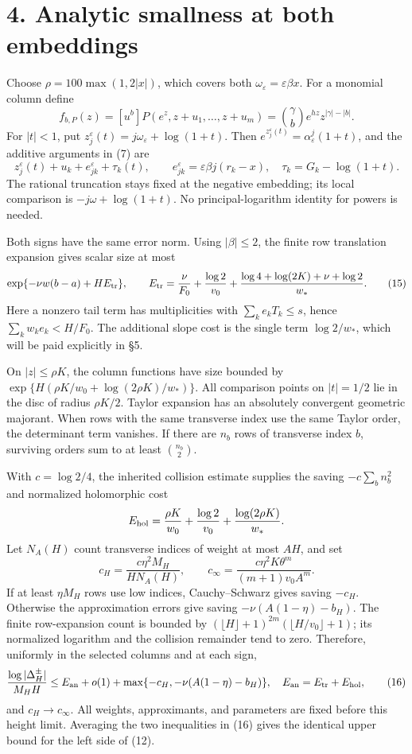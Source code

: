 \documentclass[11pt]{article}
\begin{document}
\section{4. Analytic smallness at both
embeddings}\label{analytic-smallness-at-both-embeddings}

Choose \(\rho=100\max(1,2|x|)\), which covers both
\(\omega_\varepsilon=\varepsilon\beta x\). For a monomial column define
\[
f_{b,P}(z)=[u^b]P(e^z,z+u_1,\ldots,z+u_m)
=\binom\gamma b e^{hz}z^{|\gamma|-|b|}.
\] For \(|t|<1\), put
\(z_j^\varepsilon(t)=j\omega_\varepsilon+\log(1+t)\). Then
\(e^{z_j^\varepsilon(t)}=\alpha_\varepsilon^j(1+t)\), and the additive
arguments in (7) are \[
z_j^\varepsilon(t)+u_k+e_{jk}^\varepsilon+\tau_k(t),\qquad
e_{jk}^\varepsilon=\varepsilon\beta j(r_k-x),\quad
\tau_k=G_k-\log(1+t).
\tag{14}
\] The rational truncation stays fixed at the negative embedding; its
local comparison is \(-j\omega+\log(1+t)\). No principal-logarithm
identity for powers is needed.

Both signs have the same error norm. Using \(|\beta|\le2\), the finite
row translation expansion gives scalar size at most \[
\exp\{-\nu w(b-a)+HE_{\rm tr}\},\qquad
E_{\rm tr}=\frac\nu{F_0}+\frac{\log2}{v_0}
+\frac{\log4+\log(2K)+\nu+\log2}{w_*}.
\tag{15}
\] Here a nonzero tail term has multiplicities with
\(\sum_ke_kT_k\le s\), hence \(\sum_kw_ke_k<H/F_0\). The additional
slope cost is the single term \(\log2/w_*\), which will be paid
explicitly in §5.

On \(|z|\le\rho K\), the column functions have size bounded by
\(\exp\{H(\rho K/w_0+\log(2\rho K)/w_*)\}\). All comparison points on
\(|t|=1/2\) lie in the disc of radius \(\rho K/2\). Taylor expansion has
an absolutely convergent geometric majorant. When rows with the same
transverse index use the same Taylor order, the determinant term
vanishes. If there are \(n_b\) rows of transverse index \(b\), surviving
orders sum to at least \(\binom{n_b}2\).

With \(c=\log2/4\), the inherited collision estimate supplies the saving
\(-c\sum_bn_b^2\) and normalized holomorphic cost \[
E_{\rm hol}=\frac{\rho K}{w_0}+\frac{\log2}{v_0}
+\frac{\log(2\rho K)}{w_*}.
\] Let \(N_A(H)\) count transverse indices of weight at most \(AH\), and
set \[
c_H=\frac{c\eta^2M_H}{HN_A(H)},\qquad
c_\infty=\frac{c\eta^2K\theta^m}{(m+1)v_0A^m}.
\] If at least \(\eta M_H\) rows use low indices, Cauchy--Schwarz gives
saving \(-c_H\). Otherwise the approximation errors give saving
\(-\nu(A(1-\eta)-b_H)\). The finite row-expansion count is bounded by
\((\lfloor H\rfloor+1)^{2m}(\lfloor H/v_0\rfloor+1)\); its normalized
logarithm and the collision remainder tend to zero. Therefore, uniformly
in the selected columns and at each sign, \[
\frac{\log|\Delta_H^\pm|}{M_HH}
\le E_{\rm an}+o(1)+
\max\{-c_H,-\nu(A(1-\eta)-b_H)\},
\quad E_{\rm an}=E_{\rm tr}+E_{\rm hol},
\tag{16}
\] and \(c_H\to c_\infty\). All weights, approximants, and parameters
are fixed before this height limit. Averaging the two inequalities in
(16) gives the identical upper bound for the left side of (12).
\end{document}
